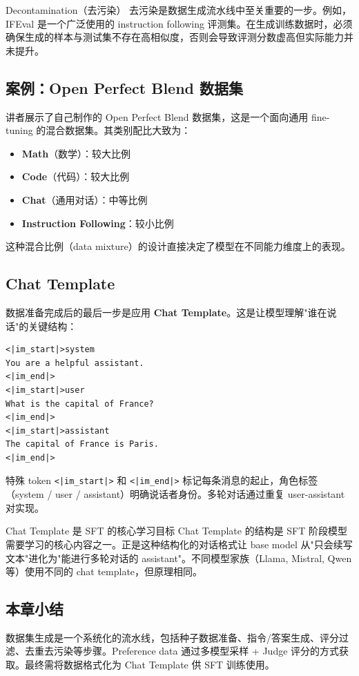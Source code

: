 \begin{knowledgebox}{Decontamination（去污染）}
去污染是数据生成流水线中至关重要的一步。例如，IFEval 是一个广泛使用的 instruction following 评测集。在生成训练数据时，必须确保生成的样本与测试集不存在高相似度，否则会导致评测分数虚高但实际能力并未提升。
\end{knowledgebox}

\subsection{案例：Open Perfect Blend 数据集}

讲者展示了自己制作的 Open Perfect Blend 数据集，这是一个面向通用 fine-tuning 的混合数据集。其类别配比大致为：

\begin{itemize}
    \item \textbf{Math}（数学）：较大比例
    \item \textbf{Code}（代码）：较大比例
    \item \textbf{Chat}（通用对话）：中等比例
    \item \textbf{Instruction Following}：较小比例
\end{itemize}

这种混合比例（data mixture）的设计直接决定了模型在不同能力维度上的表现。

\subsection{Chat Template}

数据准备完成后的最后一步是应用 \textbf{Chat Template}。这是让模型理解"谁在说话"的关键结构：

\begin{lstlisting}[caption={Chat Template 示例（ChatML 格式）}]
<|im_start|>system
You are a helpful assistant.
<|im_end|>
<|im_start|>user
What is the capital of France?
<|im_end|>
<|im_start|>assistant
The capital of France is Paris.
<|im_end|>
\end{lstlisting}

特殊 token \texttt{<|im\_start|>} 和 \texttt{<|im\_end|>} 标记每条消息的起止，角色标签（system / user / assistant）明确说话者身份。多轮对话通过重复 user-assistant 对实现。

\begin{importantbox}{Chat Template 是 SFT 的核心学习目标}
Chat Template 的结构是 SFT 阶段模型需要学习的核心内容之一。正是这种结构化的对话格式让 base model 从"只会续写文本"进化为"能进行多轮对话的 assistant"。不同模型家族（Llama, Mistral, Qwen 等）使用不同的 chat template，但原理相同。
\end{importantbox}

\subsection{本章小结}

数据集生成是一个系统化的流水线，包括种子数据准备、指令/答案生成、评分过滤、去重去污染等步骤。Preference data 通过多模型采样 + Judge 评分的方式获取。最终需将数据格式化为 Chat Template 供 SFT 训练使用。

\newpage
